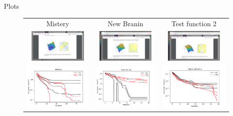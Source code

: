 \documentclass{beamer}
\begin{document}
\begin{frame}{Plots}
\begin{figure}
	
	\centering
	\begin{tabular}{ccc}
		Mistery&
		New Branin&
		Test function 2\\
		
		\includegraphics[height=1.6cm, trim={450 300 450 300},clip]{Mistery.png}&
		\includegraphics[height=1.6cm, trim={450 240 450 360},clip]{New_Branin.png}&
		\includegraphics[height=1.6cm, trim={450 230 450 370},clip]{test_function_2.png}\\
		\includegraphics[width=0.32\linewidth]{mistery_OC.pdf}&
		\includegraphics[width=0.32\linewidth]{New_Branin_OC.pdf}&
		\includegraphics[width=0.32\linewidth]{test_function_2_OC.pdf}\\
	\end{tabular}	
\end{figure}
\end{frame}
\end{document}
